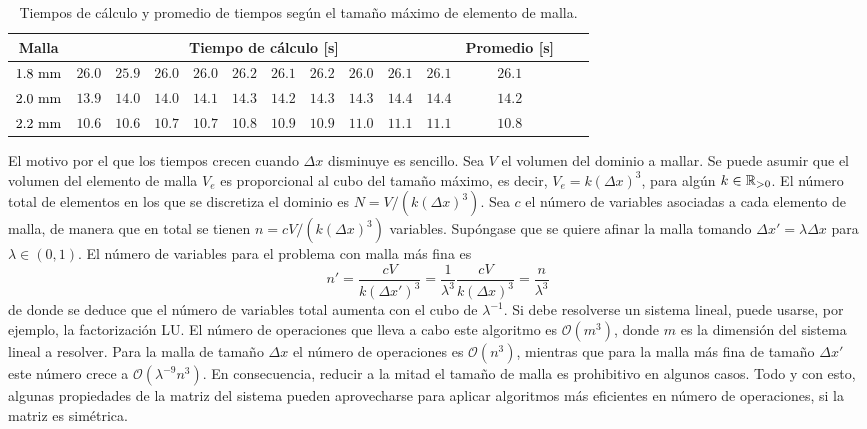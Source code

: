 \begin{table}[t]
    \centering
    \begin{tabular}{cccccccccccccc}
        \toprule[0.50mm]
        \textbf{Malla} & 
        \multicolumn{10}{c}{\textbf{Tiempo de cálculo [s]}} & 
        \textbf{Promedio [s]} \\
        \midrule[0.25mm]
        $1.8 \ \milli\meter$ &
        $26.0$ & $25.9$ & $26.0$ & $26.0$ & $26.2$ & $26.1$ & $26.2$ & $26.0$ & 
        $26.1$ & $26.1$ & $26.1$ \\
        $2.0 \ \milli\meter$ & 
        $13.9$ & $14.0$ & $14.0$ & $14.1$ & $14.3$ & $14.2$ & $14.3$ & $14.3$ & 
        $14.4$ & $14.4$ & $14.2$ \\
        $2.2 \ \milli\meter$ & 
        $10.6$ & $10.6$ & $10.7$ & $10.7$ & $10.8$ & $10.9$ & $10.9$ & $11.0$ & 
        $11.1$ & $11.1$ & $10.8$ \\
        \bottomrule[0.50mm]
    \end{tabular}
    \caption{Tiempos de cálculo y promedio de tiempos según el tamaño máximo de elemento de malla.}
    \label{tab:tiempo_calculo}
\end{table}

El motivo por el que los tiempos crecen cuando $\Delta x$ disminuye es sencillo. Sea $V$ el volumen del dominio a mallar. Se puede asumir que el volumen del elemento de malla $V_e$ es proporcional al cubo del tamaño máximo, es decir, $V_e = k (\Delta x)^3$, para algún $k \in \mathbb{R}_{> 0}$. El número total de elementos en los que se discretiza el dominio es $N = V / (k (\Delta x)^3)$. Sea $c$ el número de variables asociadas a cada elemento de malla, de manera que en total se tienen $n = c V / (k (\Delta x)^3)$ variables. Supóngase que se quiere afinar la malla tomando $\Delta x' = \lambda \Delta x$ para $\lambda \in (0, 1)$. El número de variables para el problema con malla más fina es
\[
    n' = \frac{c V}{k (\Delta x')^3} = 
    \frac{1}{\lambda^3} \frac{c V}{k (\Delta x)^3} = 
    \frac{n}{\lambda^3}
\]
de donde se deduce que el número de variables total aumenta con el cubo de $\lambda^{-1}$. Si debe resolverse un sistema lineal, puede usarse, por ejemplo, la factorización LU. El número de operaciones que lleva a cabo este algoritmo es $\mathcal{O}(m^3)$, donde $m$ es la dimensión del sistema lineal a resolver. Para la malla de tamaño $\Delta x$ el número de operaciones es $\mathcal{O}(n^3)$, mientras que para la malla más fina de tamaño $\Delta x'$ este número crece a $\mathcal{O}(\lambda^{-9} n^3)$. En consecuencia, reducir a la mitad el tamaño de malla es prohibitivo en algunos casos. Todo y con esto, algunas propiedades de la matriz del sistema pueden aprovecharse para aplicar algoritmos más eficientes en número de operaciones, \eg si la matriz es simétrica.
